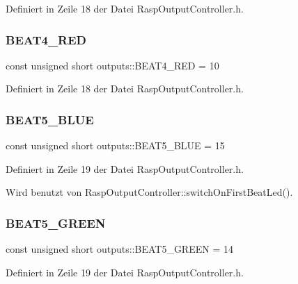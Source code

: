 Definiert in Zeile 18 der Datei Rasp\+Output\+Controller.\+h.

\mbox{\label{namespaceoutputs_a73a38f1135a723ebb294500daa641aec}} 
\subsubsection{\texorpdfstring{B\+E\+A\+T4\+\_\+\+R\+ED}{BEAT4\_RED}}
{\footnotesize\ttfamily const unsigned short outputs\+::\+B\+E\+A\+T4\+\_\+\+R\+ED = 10}



Definiert in Zeile 18 der Datei Rasp\+Output\+Controller.\+h.

\mbox{\label{namespaceoutputs_a0fab71f89a857d67f1329fbd097046ae}} 
\subsubsection{\texorpdfstring{B\+E\+A\+T5\+\_\+\+B\+L\+UE}{BEAT5\_BLUE}}
{\footnotesize\ttfamily const unsigned short outputs\+::\+B\+E\+A\+T5\+\_\+\+B\+L\+UE = 15}



Definiert in Zeile 19 der Datei Rasp\+Output\+Controller.\+h.



Wird benutzt von Rasp\+Output\+Controller\+::switch\+On\+First\+Beat\+Led().

\mbox{\label{namespaceoutputs_a4b1e0d3ad2b80752a68cdec9a73f5ac6}} 
\subsubsection{\texorpdfstring{B\+E\+A\+T5\+\_\+\+G\+R\+E\+EN}{BEAT5\_GREEN}}
{\footnotesize\ttfamily const unsigned short outputs\+::\+B\+E\+A\+T5\+\_\+\+G\+R\+E\+EN = 14}



Definiert in Zeile 19 der Datei Rasp\+Output\+Controller.\+h.

